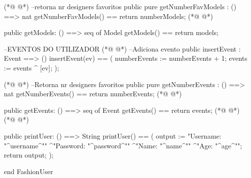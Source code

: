 \begin{vdmpp}[breaklines=true]
(*@
\label{getNumberFavModels:79}
@*)
  --retorna nr designers favoritos
   public pure getNumberFavModels : () ==> nat
   getNumberFavModels() == return numberModels;
(*@
\label{getModels:82}
@*)
   
   public getModels: () ==> seq of Model
   getModels() == return models;
   
   
    --EVENTOS DO UTILIZADOR
(*@
\label{insertEvent:88}
@*)
    --Adiciona evento
  public insertEvent : Event ==> ()
   insertEvent(ev) ==
   (
     numberEvents := numberEvents + 1;
     events := events ^ [ev];
   );
   
(*@
\label{getNumberEvents:96}
@*)
  --Retorna nr designers favoritos
   public pure getNumberEvents : () ==> nat
   getNumberEvents() == return numberEvents;
(*@
\label{getEvents:99}
@*)

   public getEvents: () ==> seq of Event
   getEvents() == return events;
(*@
\label{printUser:102}
@*)
(*@
\label{printFashionFestival:102}
@*)
   
   public printUser: () ==> String
  printUser() == (
  output := "Username: "^username^"\n"
       ^"Password: "^password^"\n"
       ^"Name: "^name^"\n"
       ^"Age: "^age^"\n";
  return output;
  );

end FashionUser
\end{vdmpp}
\bigskip
